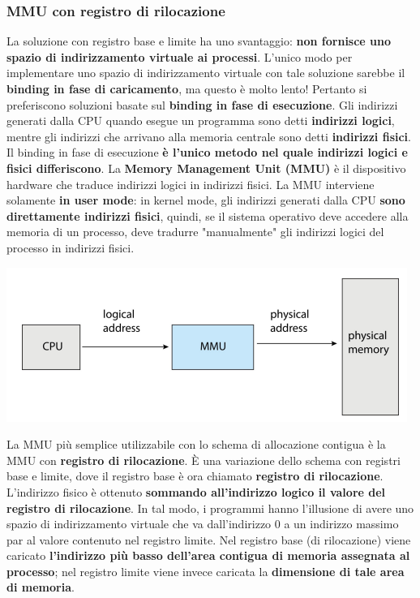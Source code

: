 \documentclass[12pt]{article}
\begin{document}
\subsubsection{MMU con registro di rilocazione}
La soluzione con registro base e limite ha uno svantaggio: \textbf{non fornisce uno spazio di indirizzamento virtuale ai processi}.
L'unico modo per implementare uno spazio di indirizzamento virtuale con tale soluzione sarebbe il \textbf{binding in fase di caricamento}, ma questo è molto lento!
Pertanto si preferiscono soluzioni basate sul \textbf{binding in fase di esecuzione}.
Gli indirizzi generati dalla CPU quando esegue un programma sono detti \textbf{indirizzi logici}, mentre gli indirizzi che arrivano alla memoria centrale sono detti \textbf{indirizzi fisici}.
Il binding in fase di esecuzione \textbf{è l'unico metodo nel quale indirizzi logici e fisici differiscono}.
La \textbf{Memory Management Unit (MMU)} è il dispositivo hardware che traduce indirizzi logici in indirizzi fisici.
La MMU interviene solamente \textbf{in user mode}: in kernel mode, gli indirizzi generati dalla CPU \textbf{sono direttamente indirizzi fisici}, quindi, se il sistema operativo deve accedere alla memoria di un processo, deve tradurre "manualmente" gli indirizzi logici del processo in indirizzi fisici.
\begin{center}
    \includegraphics[width = 0.70\linewidth]{Images/56.png}
\end{center}
La MMU più semplice utilizzabile con lo schema di allocazione contigua è la MMU con \textbf{registro di rilocazione}.
È una variazione dello schema con registri base e limite, dove il registro base è ora chiamato \textbf{registro di rilocazione}.
L'indirizzo fisico è ottenuto \textbf{sommando all'indirizzo logico il valore del registro di rilocazione}.
In tal modo, i programmi hanno l'illusione di avere uno spazio di indirizzamento virtuale che va dall'indirizzo 0 a un indirizzo massimo par al valore contenuto nel registro limite.
Nel registro base (di rilocazione) viene caricato \textbf{l'indirizzo più basso dell'area contigua di memoria assegnata al processo}; nel registro limite viene invece caricata la \textbf{dimensione di tale area di memoria}.
\end{document}
